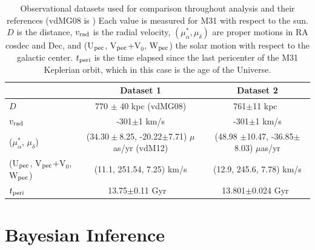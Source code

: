 \documentclass[twocolumn]{aastex631}
\begin{document}
\begin{table}
  \centering
  \begin{tabular}{lc|c}
    \hline\hline
                    & Dataset 1                     & Dataset 2 \\\hline
  $D$               &  770 $\pm$ 40 \rm kpc (vdMG08)     &   761$\pm$11 \rm kpc~\citep{Li2021}        \\
  $v_{\rm rad}$     &     -301$\pm$1 km/s       &   -301$\pm$1 km/s        \\
  ($\mu_\alpha^*$,  $\mu_\delta$)    & ($34.30\pm$8.25, -20.22$\pm$7.71) $\mu$as/yr (vdM12) & (48.98 $\pm$10.47, -36.85$\pm$8.03) $\mu$as/yr \citep{Salomon2021}\\
  (U$_{\rm pec}$, V$_{\rm pec}$+V$_0$, W$_{\rm pec}$) & (11.1, 251.54, 7.25) km/s& (12.9, 245.6, 7.78) km/s \citep{Drimmel2018}\\
  $t_{\rm peri}$ & 13.75$\pm$0.11 Gyr ~\citep{Jarosik2011} & 13.801$\pm$0.024 Gyr~\citep{?}\\
  \hline\hline

  \end{tabular}
  \caption{\label{table:data}Observational datasets used for comparison throughout analysis and their references (vdMG08 is \cite{vdm2008}) Each value is measured for M31 with respect to the sun. $D$ is the distance, $v_{\rm rad}$ is the radial velocity, $(\mu^*_{\alpha}, \mu_{\delta})$ are proper motions in RA cosdec and Dec, and (U$_{\rm pec}$, V$_{\rm pec}$+V$_0$, W$_{\rm pec}$) the solar motion with respect to the galactic center. $t_{\rm peri}$ is the time elapsed since the last pericenter of the M31 Keplerian orbit, which in this case is the age of the Universe. }
\end{table}


\section{Bayesian Inference}
\label{sec:bayes}
\end{document}
